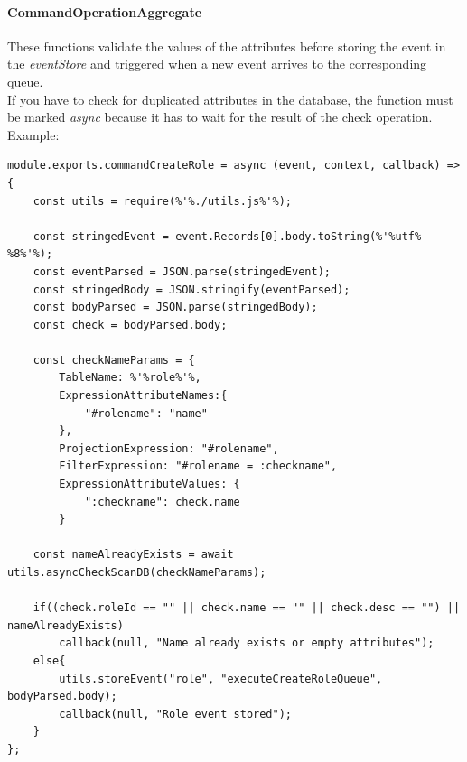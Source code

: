 \paragraph{CommandOperationAggregate} \Spazio
These functions validate the values of the attributes before storing the event in the \emph{eventStore} and triggered when a new event arrives to the corresponding queue. \\ 
If you have to check for duplicated attributes in the database, the function must be marked \emph{async} because it has to wait for the result of the check operation.\\
Example:
\begin{lstlisting}[escapechar=\%]
module.exports.commandCreateRole = async (event, context, callback) => {
	const utils = require(%'%./utils.js%'%);
	
	const stringedEvent = event.Records[0].body.toString(%'%utf%-%8%'%);
	const eventParsed = JSON.parse(stringedEvent);
	const stringedBody = JSON.stringify(eventParsed);
	const bodyParsed = JSON.parse(stringedBody);
	const check = bodyParsed.body;
	
	const checkNameParams = {
		TableName: %'%role%'%,
		ExpressionAttributeNames:{
			"#rolename": "name"
		},
		ProjectionExpression: "#rolename",
		FilterExpression: "#rolename = :checkname",
		ExpressionAttributeValues: {
			":checkname": check.name
		}
		
	const nameAlreadyExists = await utils.asyncCheckScanDB(checkNameParams);
	
	if((check.roleId == "" || check.name == "" || check.desc == "") || nameAlreadyExists)
		callback(null, "Name already exists or empty attributes");
	else{
		utils.storeEvent("role", "executeCreateRoleQueue", bodyParsed.body);
		callback(null, "Role event stored");
	}
};
\end{lstlisting}

